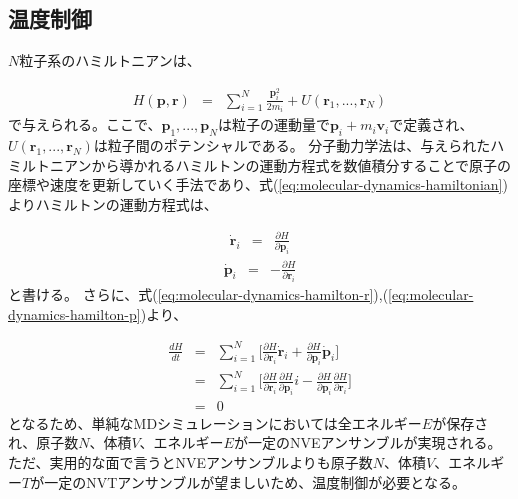 \documentclass[titlepage]{jsreport}
\begin{document}
\subsection{温度制御}\label{principle-subsec:temperature-control}
$N$粒子系のハミルトニアンは、

\large
\begin{eqnarray}
H(\mathbf{p},\mathbf{r}) &=& \sum_{i=1}^N\frac{\mathbf{p}_i^2}{2m_i}+U(\mathbf{r}_1,...,\mathbf{r}_N) \label{eq:molecular-dynamics-hamiltonian}
\end{eqnarray}
\normalsize
で与えられる\cite{molecular-dynamics-hamiltonian}。ここで、$\mathbf{p}_1,...,\mathbf{p}_N$は粒子の運動量で$\mathbf{p}_i+m_i\mathbf{v}_i$で定義され、$U(\mathbf{r}_1,...,\mathbf{r}_N)$は粒子間のポテンシャルである。
分子動力学法は、与えられたハミルトニアンから導かれるハミルトンの運動方程式を数値積分することで原子の座標や速度を更新していく手法であり、式(\ref{eq:molecular-dynamics-hamiltonian})よりハミルトンの運動方程式は、

\large
\begin{eqnarray}
\dot{\mathbf{r}}_i &=& \frac{\partial H}{\partial \mathbf{p}_i} \label{eq:molecular-dynamics-hamilton-r}
\end{eqnarray}
\normalsize
\large
\begin{eqnarray}
\dot{\mathbf{p}}_i &=& -\frac{\partial H}{\partial \mathbf{r}_i} \label{eq:molecular-dynamics-hamilton-p}
\end{eqnarray}
\normalsize
と書ける。
さらに、式(\ref{eq:molecular-dynamics-hamilton-r}),(\ref{eq:molecular-dynamics-hamilton-p})より、

\large
\begin{eqnarray}
\frac{dH}{dt} &=& \sum_{i=1}^N\Bigg[\frac{\partial H}{\partial \mathbf{r}_i}\dot{\mathbf{r}}_i+\frac{\partial H}{\partial \mathbf{p}_i}\dot{\mathbf{p}}_i\Bigg] \nonumber \\
              &=&  \sum_{i=1}^N\Bigg[\frac{\partial H}{\partial \mathbf{r}_i}\frac{\partial H}{\partial \mathbf{p}_i}i-\frac{\partial H}{\partial \mathbf{p}_i}\frac{\partial H}{\partial \mathbf{r}_i}\Bigg] \nonumber \\
              &=& 0 \label{eq:molecular-dynamics-hamilton-H}
\end{eqnarray}
\normalsize
となるため、単純なMDシミュレーションにおいては全エネルギー$E$が保存され、原子数$N$、体積$V$、エネルギー$E$が一定のNVEアンサンブル\cite{nve-ensemble}が実現される。
ただ、実用的な面で言うとNVEアンサンブルよりも原子数$N$、体積$V$、エネルギー$T$が一定のNVTアンサンブル\cite{nvt-ensemble}が望ましいため、温度制御が必要となる。
\end{document}
